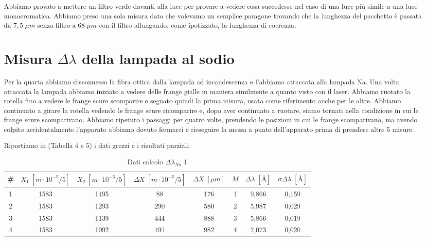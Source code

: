 \documentclass{article}
\begin{document}
Abbiamo provato a mettere un filtro verde davanti alla luce per provare a vedere cosa succedesse nel caso di una luce più simile a una luce monocromatica. Abbiamo preso una sola misura dato che volevamo un semplice paragone trovando che la lunghezza del pacchetto è passata da $7,5 \; \mu m$ senza filtro a $68 \; \mu m$ con il filtro allungando, come ipotizzato, la lunghezza di coerenza.




\section{Misura $\Delta\lambda$ della lampada al sodio}
Per la quarta abbiamo disconnesso la fibra ottica dalla lampada ad incandescenza e l'abbiamo attaccata alla lampada Na. Una volta attaccata la lampada abbiamo iniziato a vedere delle frange gialle in maniera similmente a quanto visto con il laser. Abbiamo ruotato la rotella fino a vedere le frange scure scomparire e segnato quindi la prima misura, usata come riferimento anche per le altre. Abbiamo continuato a girare la rotella vedendo le frange scure ricomparire e, dopo aver continuato a ruotare, siamo tornati nella condizione in cui le frange scure scomparivano. Abbiamo ripetuto i passaggi per quatro volte, prendendo le posizioni in cui le frange scomparivano, ma avendo colpito accidentalmente l'apparato abbiamo dovuto fermarci e rieseguire la messa a punto dell'apparato prima di prendere altre 5 misure.

Riportiamo in (Tabella 4 e 5) i dati grezzi e i risultati parziali.

\begin{table}[h!]
\centering
\begin{tabular}{ | c | c | c | c | c | c | c | c |}
\hline
 \# & $X_1 \; [m \cdot 10^{-5}/5]$ & $X_2 \; [m \cdot 10^{-5}/5]$ & $\Delta X \; [m \cdot 10^{-5}/5]$ & $\Delta X \; [\mu m]$ & $M$ & $\Delta\lambda \; [\textrm{Å}]$ & $\sigma\Delta\lambda \; [\textrm{Å}]$\\
\hline
   1 & 1583 & 1495 & 88 & 176 & 1 & 9,866 & 0,159\\
   2 & 1583 & 1293 & 290 & 580 & 2 & 5,987 & 0,029\\
   3 & 1583 & 1139 & 444 & 888 & 3 & 5,866 & 0,019\\
   4 & 1583 & 1092 & 491 & 982 & 4 & 7,073 & 0,020\\
\hline
\end{tabular}
\caption{Dati calcolo $\Delta\lambda_{Na}$ 1}
\label{table:4}
\end{table}
\end{document}
